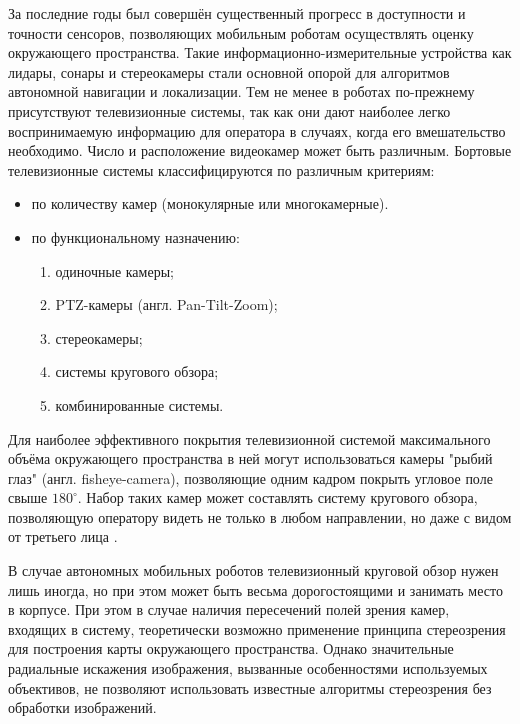 За последние годы был совершён существенный прогресс в доступности и точности сенсоров, позволяющих мобильным роботам 
осуществлять оценку окружающего пространства. Такие информационно-измерительные устройства как лидары, сонары и стереокамеры
 стали основной опорой для алгоритмов автономной навигации и локализации. Тем не менее в роботах по-прежнему 
присутствуют телевизионные системы, так как они дают наиболее легко воспринимаемую информацию для оператора в случаях, когда 
его вмешательство необходимо. 
Число и расположение видеокамер может быть различным. Бортовые телевизионные системы классифицируются по различным 
критериям\cite{varlashin}:
\begin{itemize} 
    \item по количеству камер (монокулярные или многокамерные).
    \item по функциональному назначению:
    \begin{enumerate}[leftmargin=12mm]  %
        \item одиночные камеры;
        \item PTZ-камеры (англ. Pan-Tilt-Zoom);
        \item стереокамеры;
        \item системы кругового обзора;
        \item комбинированные системы.
    \end{enumerate}
\end{itemize}

Для наиболее эффективного покрытия телевизионной системой максимального объёма окружающего пространства в ней могут использоваться 
камеры "рыбий глаз" (англ. fisheye-camera), позволяющие одним кадром покрыть угловое поле свыше $180^\circ$.  
Набор таких камер может составлять систему кругового обзора, позволяющую оператору видеть не только в любом направлении,                
но даже с видом от третьего лица \cite{birdeye}. 
    
В случае автономных мобильных роботов телевизионный круговой обзор нужен лишь иногда, но при этом может быть весьма 
дорогостоящими и занимать место в корпусе. При этом в случае наличия пересечений полей зрения камер, входящих в систему, теоретически возможно 
применение принципа стереозрения для построения карты окружающего пространства. Однако значительные радиальные искажения изображения, вызванные 
особенностями используемых объективов, не позволяют использовать известные алгоритмы стереозрения без обработки изображений.                                   
 
